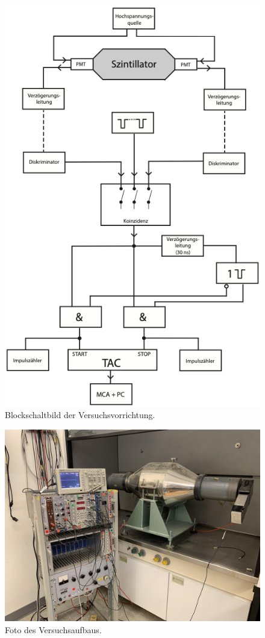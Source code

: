 \begin{figure}
    \centering
    \includegraphics[width=0.7\linewidth]{figures/Aufbau.png}
    \caption{Blockschaltbild der Versuchsvorrichtung. \cite{V01}}
    \label{fig:Aufbau}
\end{figure}

\begin{figure}
    \centering
    \includegraphics[width=0.7\linewidth]{figures/Aufbau_Foto.jpg}
    \caption{Foto des Versuchsaufbaus.}
    \label{fig:Aufbau_Foto}
\end{figure}

